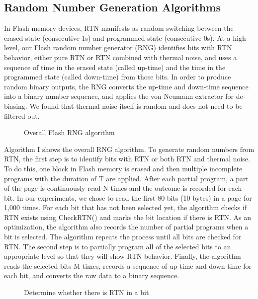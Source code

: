\subsection{Random Number Generation Algorithms}

In Flash memory devices, RTN manifests as random switching between the erased state (consecutive 1s) and programmed state (consecutive 0s). At a high-level, our Flash random number generator (RNG) identifies bits with RTN behavior, either pure RTN or RTN combined with thermal noise, and uses a sequence of time in the erased state (called up-time) and the time in the programmed state (called down-time) from those bits. In order to produce random binary outputs, the RNG converts the up-time and down-time sequence into a binary number sequence, and applies the von Neumann extractor for de-biasing. We found that thermal noise itself is random and does not need to be filtered out.

\begin{figure} 
\begin{center} 
 
\caption{Overall Flash RNG algorithm}
\label{fig:overal_rng_al} 
\vspace{-0.25in}
\end{center} 
\end{figure}

Algorithm I shows the overall RNG algorithm. To generate random numbers from RTN, the first step is to identify bits with RTN or both RTN and thermal noise. To do this, one block in Flash memory is erased and then multiple incomplete programs with the duration of T are applied. After each partial program, a part of the page is continuously read N times and the outcome is recorded for each bit. In our experiments, we chose to read the first 80 bits (10 bytes) in a page for 1,000 times. For each bit that has not been selected yet, the algorithm checks if RTN exists using CheckRTN() and marks the bit location if there is RTN. As an optimization, the algorithm also records the number of partial programs when a bit is selected. The algorithm repeats the process until all bits are checked for RTN. The second step is to partially program all of the selected bits to an appropriate level so that they will show RTN behavior. Finally, the algorithm reads the selected bits M times, records a sequence of up-time and down-time for each bit, and converts the raw data to a binary sequence. 

\begin{figure} 
\begin{center} 
 
\caption{Determine whether there is RTN in a bit}
\label{fig:rtn_bit} 
\vspace{-0.25in}
\end{center} 
\end{figure}

